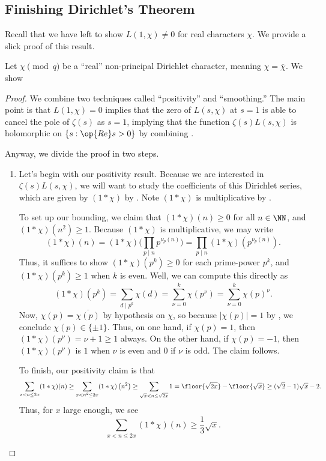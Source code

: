 \documentclass[../notes.tex]{subfiles}
\begin{document}
\subsection{Finishing Dirichlet's Theorem}
Recall that we have left to show $L(1,\chi)\ne0$ for real characters $\chi$. We provide a slick proof of this result.
\begin{lemma}
	Let $\chi\pmod q$ be a ``real'' non-principal Dirichlet character, meaning $\chi=\overline\chi$. We show 
\end{lemma}
\begin{proof}
	We combine two techniques called ``positivity'' and ``smoothing.'' The main point is that $L(1,\chi)=0$ implies that the zero of $L(s,\chi)$ at $s=1$ is able to cancel the pole of $\zeta(s)$ as $s=1$, implying that the function $\zeta(s)L(s,\chi)$ is holomorphic on $\{s:\op{Re}s>0\}$ by combining .

	Anyway, we divide the proof in two steps.
	\begin{enumerate}
		\item Let's begin with our positivity result. Because we are interested in $\zeta(s)L(s,\chi)$, we will want to study the coefficients of this Dirichlet series, which are given by $(1*\chi)$ by . Note $(1*\chi)$ is multiplicative by .

		To set up our bounding, we claim that $(1*\chi)(n)\ge0$ for all $n\in\NN$, and $(1*\chi)\left(n^2\right)\ge1$. Because $(1*\chi)$ is multiplicative, we may write
		\[(1*\chi)(n)=(1*\chi)\Bigg(\prod_{p\mid n}p^{\nu_p(n)}\Bigg)=\prod_{p\mid n}(1*\chi)\left(p^{\nu_p(n)}\right).\]
		Thus, it suffices to show $(1*\chi)\left(p^k\right)\ge0$ for each prime-power $p^k$, and $(1*\chi)\left(p^k\right)\ge1$ when $k$ is even. Well, we can compute this directly as
		\[(1*\chi)\left(p^k\right)=\sum_{d\mid p^k}\chi(d)=\sum_{\nu=0}^k\chi\left(p^\nu\right)=\sum_{\nu=0}^k\chi(p)^\nu.\]
		Now, $\chi(p)=\overline{\chi(p)}$ by hypothesis on $\chi$, so because $|\chi(p)|=1$ by , we conclude $\chi(p)\in\{\pm1\}$. Thus, on one hand, if $\chi(p)=1$, then $(1*\chi)\left(p^\nu\right)=\nu+1\ge1$ always. On the other hand, if $\chi(p)=-1$, then $(1*\chi)\left(p^\nu\right)$ is $1$ when $\nu$ is even and $0$ if $\nu$ is odd. The claim follows.
	
		To finish, our positivity claim is that
		\[\sum_{x<n\le2x}(1*\chi)(n)\ge\sum_{x<n^2\le2x}(1*\chi)\left(n^2\right)\ge\sum_{\sqrt x<n\le\sqrt{2x}}1=\floor{\sqrt{2x}}-\floor{\sqrt x}\ge(\sqrt2-1)\sqrt x-2.\]
		Thus, for $x$ large enough, we see
		\[\sum_{x<n\le2x}(1*\chi)(n)\ge\frac13\sqrt x.\]


\end{enumerate}
\end{proof}
\end{document}
